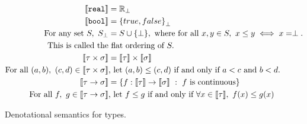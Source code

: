 \begin{figure}
 \begin{align*}
\llbracket \texttt{real} \rrbracket &= \mathbb{R}_{\perp} \\
 \llbracket \texttt{bool} \rrbracket &= {\{true, false\}}_{\perp} \\
\text{For any set } S, \ S_{\perp} &= S \cup \{\perp\}, \text{ where for all } x, y\in S, \ x \leq y \iff x = \perp. \\
 \text{This is called the}&\text{ flat ordering of } S.\\
 \llbracket \tau \times \sigma \rrbracket &= \llbracket \tau \rrbracket \times \llbracket \sigma \rrbracket  \\
 \text{For all } (a, b), \ (c, d) \in \llbracket \tau \times \sigma \rrbracket &\text{, let }  (a,b) \leq (c,d) \text{ if and only if } a<c \text{ and } b<d. \\ 
 \llbracket \tau \rightarrow \sigma \rrbracket &= \{f: \llbracket \tau \rrbracket \rightarrow \llbracket \sigma \rrbracket \ : 
 \ f \text{ is continuous}\} \\
 \text{ For all } f, \ g \in \llbracket \tau \rightarrow \sigma \rrbracket &\text{, let } f \leq g \text{ if and only if } \forall x \in 
 \llbracket \tau \rrbracket, \ f(x) \leq g(x) 
 \end{align*}
 \caption{Denotational semantics for types.}
 \end{figure}
